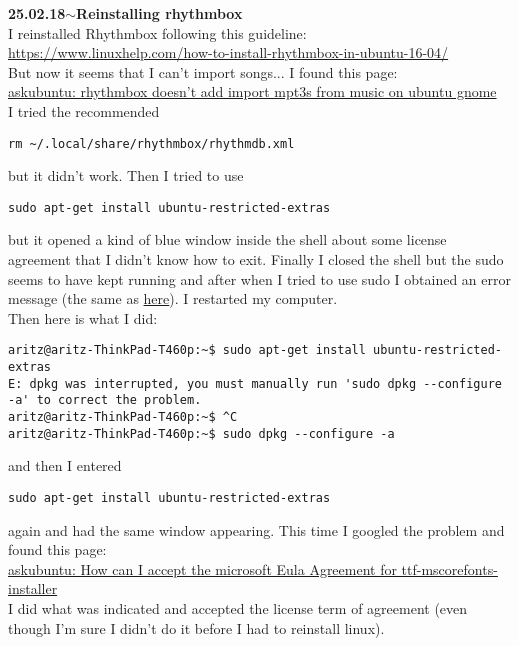 \documentclass[11pt,a4paper]{article}
\newenvironment{loggentry}[2]%
{\noindent\textbf{#1}\hspace{1cm}$\mathbf{\sim}$\text{ }\textbf{#2}\\}{\vspace{0.5cm}}
\begin{document}
\begin{loggentry}{25.02.18}{Reinstalling rhythmbox}
I reinstalled Rhythmbox following this guideline:\\
\url{https://www.linuxhelp.com/how-to-install-rhythmbox-in-ubuntu-16-04/}\\
But now it seems that I can't import songs... I found this page:\\
\href{https://askubuntu.com/questions/617816/rhythmbox-doesnt-add-import-mp3s-from-music-on-ubuntu-gnome-15-04#618148}{askubuntu: rhythmbox doesn't add import mpt3s from music on ubuntu gnome}\\
I tried the recommended
\begin{verbatim}
rm ~/.local/share/rhythmbox/rhythmdb.xml
\end{verbatim}
but it didn't work. Then I tried to use
\begin{verbatim}
sudo apt-get install ubuntu-restricted-extras
\end{verbatim}
but it opened a kind of blue window inside the shell about some license agreement that I didn't know how to exit. Finally I closed the shell but the sudo seems to have kept running and after when I tried to use sudo I obtained an error message (the same as \href{https://askubuntu.com/questions/15433/unable-to-lock-the-administration-directory-var-lib-dpkg-is-another-process#102084}{here}). I restarted my computer.\\
Then here is what I did:
\begin{verbatim}
aritz@aritz-ThinkPad-T460p:~$ sudo apt-get install ubuntu-restricted-extras
E: dpkg was interrupted, you must manually run 'sudo dpkg --configure -a' to correct the problem. 
aritz@aritz-ThinkPad-T460p:~$ ^C
aritz@aritz-ThinkPad-T460p:~$ sudo dpkg --configure -a
\end{verbatim}
and then I entered
\begin{verbatim}
sudo apt-get install ubuntu-restricted-extras
\end{verbatim}
again and had the same window appearing. This time I googled the problem and found this page:\\
\href{https://askubuntu.com/questions/16225/how-can-i-accept-the-microsoft-eula-agreement-for-ttf-mscorefonts-installer}{askubuntu: How can I accept the microsoft Eula Agreement for ttf-mscorefonts-installer}\\
I did what was indicated and accepted the license term of agreement (even though I'm sure I didn't do it before I had to reinstall linux).\\

\end{loggentry}
\end{document}
